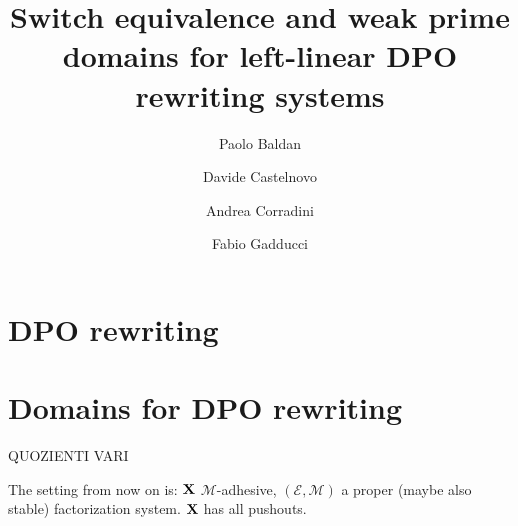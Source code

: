 \documentclass[a4paper,twoside]{report}
\title{Switch equivalence and weak prime domains for left-linear DPO rewriting systems}
\author{Paolo Baldan\and Davide Castelnovo\and  Andrea Corradini\and Fabio Gadducci}
\def\X{\textbf {\textup{X}}}
\theoremstyle{definition}
\begin{document}
\maketitle
\tableofcontents




\part{DPO rewriting}





\part{Domains for DPO rewriting}





\iffalse 
\newpage
QUOZIENTI VARI

The setting from now on is: $\X$ $\mathcal{M}$-adhesive, $(\mathcal{E}, \mathcal{M})$ a proper (maybe also stable) factorization system. $\X$ has all pushouts.
\end{document}
